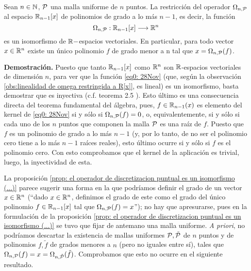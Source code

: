 \begin{prop}
\label{prop: el operador de discretizacion puntual es un isomorfismo (...)}
Sean $n \in \mathbb{N}$, $\mathcal{P}$ una malla uniforme de $n$
puntos. 
La restricción del operador $\Omega_{n, \mathcal{P}}$
al espacio $\mathbb{R}_{n-1}[x]$ de polinomios de grado a lo más
$n-1$, es decir, la función 
\begin{equation}
\label{eq0: 28Nov}
\Omega_{n, \mathcal{P}}:
\mathbb{R}_{n-1}[x] \longrightarrow \mathbb{R}^{n}
\end{equation}
es un isomorfismo de $\mathbb{R}-$espacios vectoriales.
En particular, para todo vector $x \in \mathbb{R}^{n}$
existe un único polinomio $f$ de grado menor a n
tal que $x = \Omega_{n, \mathcal{P}}(f)$.
\end{prop}
\noindent
\textbf{Demostración.}
Puesto que tanto $\mathbb{R}_{n-1}[x]$
como $\mathbb{R}^{n}$ son $\mathbb{R}$-espacios vectoriales
de dimensión $n$, para ver que la función 
\eqref{eq0: 28Nov} (que, según la observación 
\ref{obs:linealidad de omega restringida a R[x]}, es lineal)
es un isomorfismo, basta
demostrar que es inyectiva 
(c.f. teorema 2.5 \cite{friedberg}).
Esto último es una consecuencia directa del 
teorema fundamental del álgebra,
pues, 
$f \in \mathbb{R}_{n-1}(x)$
es elemento del kernel
de \eqref{eq0: 28Nov} si y sólo si 
$\Omega_{n, \mathcal{P}}(f)=0$, o, equivalentemente,
si y sólo si 
cada uno de los $n$ puntos que componen la
malla $\mathcal{P}$ es una raíz de $f$. Puesto que
$f$ es un polinomio de grado a lo más $n-1$
(y, por lo tanto, de no ser el polinomio cero tiene
a lo más $n-1$ raíces reales),
esto último ocurre si y sólo si $f$ es el polinomio cero.
Con esto comprobamos que el kernel de la aplicación
\label{eq1: 25Nov} es trivial, luego, la inyectividad
de esta.
\QEDB
\vspace{0.2cm}

La proposición
\ref{prop: el operador de discretizacion puntual es un isomorfismo (...)}
parece sugerir 
una forma en la que podríamos 
definir el grado de 
un vector $x \in \mathbb{R}^{n}$ (``dado $x \in \mathbb{R}^{n}$, definimos
el grado de este como el grado del único polinomio $f \in \mathbb{R}_{n-1}[x]$
tal que $\Omega_{n, \mathcal{P}}(f)=x$''); no hay
que apresurarse, pues en la formulación de
la proposición
\ref{prop: el operador de discretizacion puntual es un isomorfismo (...)}
se tuvo que fijar de antemano una malla uniforme.
\textit{A priori}, no podríamos descartar 
la existencia de mallas uniformes
$\mathcal{P}, \tilde{\mathcal{P}}$ 
de $n$ puntos
y de polinomios
$f, \tilde{f}$ de grados menores a $n$ (pero no 
iguales entre sí), tales que
$\Omega_{n, \mathcal{P}}(f) = x = \Omega_{n, \tilde{\mathcal{P}}}(\tilde{f})$.
Comprobamos que esto no ocurre
en el siguiente resultado.

